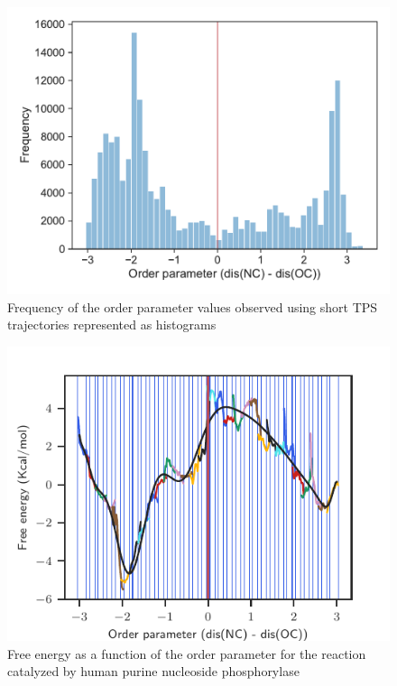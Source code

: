 \documentclass{report}
\begin{document}
\begin{figure}[ht!]
\centering
\includegraphics[scale=0.75]{figures/dist.pdf}
\caption{Frequency of the order parameter values observed using short TPS trajectories represented as histograms}
\end{figure}


\begin{figure}[ht!]
\centering
\includegraphics[scale=1.0]{figures/pnp-fenergy.pdf}
\caption{Free energy as a function of the order parameter for the reaction catalyzed by human purine nucleoside phosphorylase}
\end{figure}
\end{document}
